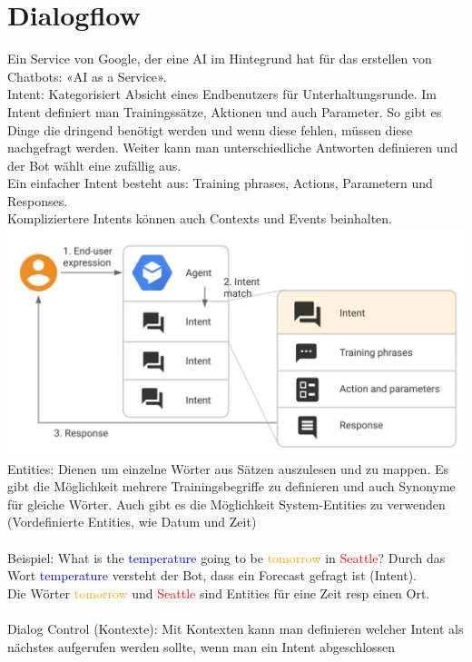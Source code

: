 \section{Dialogflow}
Ein Service von Google, der eine AI im Hintegrund hat für das erstellen von Chatbots: «AI as a Service».
\\
\textcolor{myblue}{Intent:} Kategorisiert Absicht eines Endbenutzers für Unterhaltungsrunde. Im Intent definiert man Trainingssätze, Aktionen und auch
Parameter. So gibt es Dinge die dringend benötigt werden und wenn diese fehlen, müssen diese nachgefragt werden. Weiter kann man unterschiedliche Antworten definieren und der Bot wählt eine zufällig aus.\\
Ein einfacher Intent besteht aus: Training phrases, Actions, Parametern und Responses.\\
Kompliziertere Intents können auch Contexts und Events beinhalten.
\includegraphics[width=\linewidth]{img/intent-example.png}
\textcolor{myblue}{Entities:} Dienen um einzelne Wörter aus Sätzen auszulesen und zu mappen. Es gibt die Möglichkeit mehrere Trainingsbegriffe zu definieren und auch Synonyme für gleiche Wörter. Auch gibt es die Möglichkeit System-Entities zu verwenden (Vordefinierte Entities, wie Datum und Zeit) \\
\\
Beispiel: What is the \textcolor{blue}{temperature} going to be \textcolor{orange}{tomorrow} in \textcolor{red}{Seattle}?
Durch das Wort \textcolor{blue}{temperature} versteht der Bot, dass ein Forecast gefragt ist (Intent).
\\
Die Wörter \textcolor{orange}{tomorrow} und \textcolor{red}{Seattle} sind Entities für eine Zeit resp einen Ort.
\\
\\
\textcolor{myblue}{Dialog Control (Kontexte):}
Mit Kontexten kann man definieren welcher Intent als nächstes aufgerufen werden sollte, wenn man ein Intent abgeschlossen
